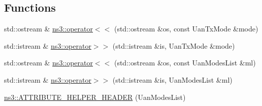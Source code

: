 \subsection*{Functions}
\begin{DoxyCompactItemize}
\item 
std\+::ostream \& \hyperlink{namespacens3_a518b42f0d94e83df55241b1e6e6ab04c}{ns3\+::operator$<$$<$} (std\+::ostream \&os, const Uan\+Tx\+Mode \&mode)
\item 
std\+::istream \& \hyperlink{namespacens3_a4bc5039937c78a48428378841e2b6256}{ns3\+::operator$>$$>$} (std\+::istream \&is, Uan\+Tx\+Mode \&mode)
\item 
std\+::ostream \& \hyperlink{namespacens3_a0ab3027b37fdc03993b6752cab300a1b}{ns3\+::operator$<$$<$} (std\+::ostream \&os, const Uan\+Modes\+List \&ml)
\item 
std\+::istream \& \hyperlink{namespacens3_a41dffd192b16c0a3293030f621e78924}{ns3\+::operator$>$$>$} (std\+::istream \&is, Uan\+Modes\+List \&ml)
\item 
\hyperlink{namespacens3_ae010a68f1af4b3cb746ecd8276dc609d}{ns3\+::\+A\+T\+T\+R\+I\+B\+U\+T\+E\+\_\+\+H\+E\+L\+P\+E\+R\+\_\+\+H\+E\+A\+D\+ER} (Uan\+Modes\+List)
\end{DoxyCompactItemize}
